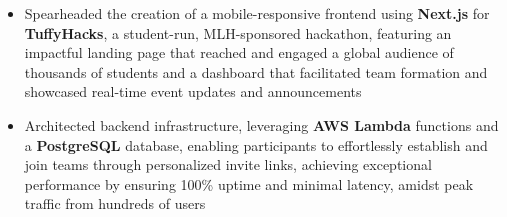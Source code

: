 \documentclass{article}
\begin{document}
\begin{itemize}
    \item Spearheaded the creation of a mobile-responsive frontend using \textbf{Next.js} for \textbf{TuffyHacks}, a student-run, MLH-sponsored hackathon, featuring an impactful landing page that reached and engaged a global audience of thousands of students and a dashboard that facilitated team formation and showcased real-time event updates and announcements
    \item Architected backend infrastructure, leveraging \textbf{AWS Lambda} functions and a \textbf{PostgreSQL} database, enabling participants to effortlessly establish and join teams through personalized invite links, achieving exceptional performance by ensuring 100\% uptime and minimal latency, amidst peak traffic from hundreds of users
\end{itemize}
\end{document}
